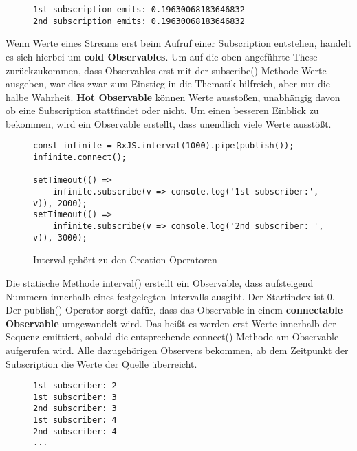 \begin{figure}[H]
\begin{lstlisting}
1st subscription emits: 0.19630068183646832
2nd subscription emits: 0.19630068183646832
\end{lstlisting}
\end{figure}

\noindent
Wenn Werte eines Streams erst beim Aufruf einer Subscription entstehen, handelt es sich hierbei um \textbf{cold Observables}\cite{hot-vs-cold}. Um auf die oben angeführte These zurückzukommen, dass Observables erst mit der subscribe() Methode Werte ausgeben, war dies zwar zum Einstieg in die Thematik hilfreich, aber nur die halbe Wahrheit. \textbf{Hot Observable} können Werte ausstoßen, unabhängig davon ob eine Subscription stattfindet oder nicht. Um einen besseren Einblick zu bekommen, wird ein Observable erstellt, dass unendlich viele Werte ausstößt.

\begin{figure}[H]
\begin{lstlisting}[basicstyle=\small]
const infinite = RxJS.interval(1000).pipe(publish());
infinite.connect();

setTimeout(() =>
    infinite.subscribe(v => console.log('1st subscriber:', v)), 2000);
setTimeout(() =>
    infinite.subscribe(v => console.log('2nd subscriber: ', v)), 3000);
\end{lstlisting}
\caption{Interval gehört zu den Creation Operatoren}
\label{interval-obs}
\end{figure}

\noindent
Die statische Methode interval() erstellt ein Observable, dass aufsteigend Nummern innerhalb eines festgelegten Intervalls ausgibt. Der Startindex ist 0. Der publish() Operator sorgt dafür, dass das Observable in einem \textbf{connectable Observable} umgewandelt wird. Das heißt es werden erst Werte innerhalb der Sequenz emittiert, sobald die entsprechende connect() Methode am Observable aufgerufen wird. Alle dazugehörigen Observers bekommen, ab dem Zeitpunkt der Subscription die Werte der Quelle überreicht.\\

\begin{figure}[H]
\begin{lstlisting}
1st subscriber: 2
1st subscriber: 3
2nd subscriber: 3
1st subscriber: 4
2nd subscriber: 4
...
\end{lstlisting}
\end{figure}

